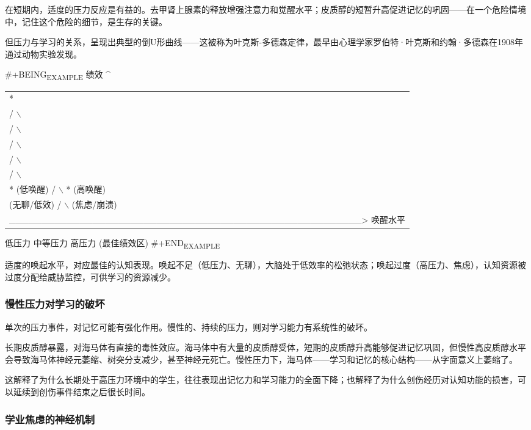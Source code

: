 \documentclass[11pt]{article}
\begin{document}
在短期内，适度的压力反应是有益的。去甲肾上腺素的释放增强注意力和觉醒水平；皮质醇的短暂升高促进记忆的巩固——在一个危险情境中，记住这个危险的细节，是生存的关键。

但压力与学习的关系，呈现出典型的倒U形曲线——这被称为叶克斯-多德森定律，最早由心理学家罗伯特·叶克斯和约翰·多德森在1908年通过动物实验发现。

\#+BEING\textsubscript{EXAMPLE}
绩效
  \^{}
\begin{center}
\begin{tabular}{l}
*\\
/   $\backslash$\\
/       $\backslash$\\
/           $\backslash$\\
/               $\backslash$\\
/                   $\backslash$\\
* (低唤醒)       /                     $\backslash$       * (高唤醒)\\
(无聊/低效)     /                       $\backslash$     (焦虑/崩溃)\\
\_\_\_\_\_\_\_\_\_\_\_\_\_\_\_\_\_\_\_\_\_\_\_\_\_\_\_\_\_\_\_\_\_\_\_\_\_\_\_\_\_\_\_\_\_\_\_\_\_\_\_\_\_\_\_> 唤醒水平\\
\end{tabular}
\end{center}
       低压力                    中等压力                   高压力
                             (最佳绩效区)
\#+END\textsubscript{EXAMPLE}

适度的唤起水平，对应最佳的认知表现。唤起不足（低压力、无聊），大脑处于低效率的松弛状态；唤起过度（高压力、焦虑），认知资源被过度分配给威胁监控，可供学习的资源减少。
\subsubsection{慢性压力对学习的破坏}
\label{sec:org6fd52b2}

单次的压力事件，对记忆可能有强化作用。慢性的、持续的压力，则对学习能力有系统性的破坏。

长期皮质醇暴露，对海马体有直接的毒性效应。海马体中有大量的皮质醇受体，短期的皮质醇升高能够促进记忆巩固，但慢性高皮质醇水平会导致海马体神经元萎缩、树突分支减少，甚至神经元死亡。慢性压力下，海马体——学习和记忆的核心结构——从字面意义上萎缩了。

这解释了为什么长期处于高压力环境中的学生，往往表现出记忆力和学习能力的全面下降；也解释了为什么创伤经历对认知功能的损害，可以延续到创伤事件结束之后很长时间。
\subsubsection{学业焦虑的神经机制}
\label{sec:org6b96922}
\end{document}
